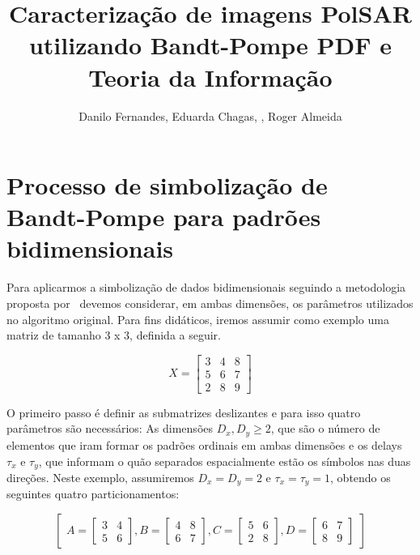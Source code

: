 \documentclass[12pt]{article}
\title{Caracterização de imagens PolSAR utilizando Bandt-Pompe PDF e Teoria da Informação}
\author{Danilo Fernandes\inst{1}, Eduarda Chagas\inst{2}, , Roger Almeida\inst{1}}
\begin{document}
\maketitle

\section{Processo de simbolização de Bandt-Pompe para padrões bidimensionais}

Para aplicarmos a simbolização de dados bidimensionais seguindo a metodologia proposta por~\cite{PermutationEntropyANaturalComplexityMeasureforTimeSeries2002} devemos considerar, em ambas dimensões, os parâmetros utilizados no algoritmo original. Para fins didáticos, iremos assumir como exemplo uma matriz de tamanho $3$ x $3$, definida a seguir.

\begin{center}
$$
X = \left[
\begin{array}{ccc}
3 & 4 & 8 \\
5 & 6 & 7 \\
2 & 8 & 9 
\end{array}
\right]
$$
\end{center}

O primeiro passo é definir as submatrizes deslizantes e para isso quatro parâmetros são necessários: As dimensões $D_{x}, D_{y} \geq 2$, que são o número de elementos que iram formar os padrões ordinais em ambas dimensões e os delays $\tau _{x}$ e $\tau_{y}$, que informam o quão separados espacialmente estão os símbolos nas duas direções. Neste exemplo, assumiremos $D_{x} = D_{y} = 2$ e $\tau_{x} = \tau_{y} = 1$, obtendo os seguintes quatro particionamentos:

\[
\begin{bmatrix}

A = \left[
\begin{array}{cc}
3 & 4 \\
5 & 6 
\end{array}
\right],

B = \left[
\begin{array}{cc}
4 & 8 \\
6 & 7 
\end{array}
\right],

C = \left[
\begin{array}{cc}
5 & 6 \\
2 & 8 
\end{array}
\right],

D = \left[
\begin{array}{cc}
6 & 7 \\
8 & 9 
\end{array}
\right]

\end{bmatrix}
\]
\end{document}
